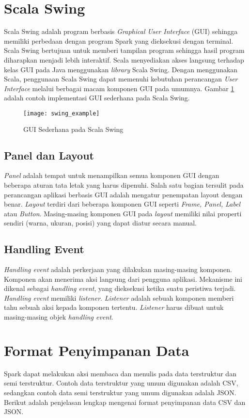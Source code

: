 \section{Scala Swing} 
Scala Swing adalah program berbasis \textit{Graphical User Interface} (GUI) sehingga memiliki perbedaan dengan program Spark yang dieksekusi dengan terminal. Scala Swing bertujuan untuk memberi tampilan program sehingga hasil program diharapkan menjadi lebih interaktif. Scala menyediakan akses langsung terhadap kelas GUI pada Java menggunakan \textit{library} Scala Swing.  Dengan menggunakan Scala, penggunaan Scala Swing dapat memenuhi kebutuhan perancangan \textit{User Interface} melalui berbagai macam komponen GUI pada umumnya. Gambar \ref{fig:swing_example} adalah contoh implementasi GUI sederhana pada Scala Swing.
\begin{figure}[H]
	\centering
	\texttt{[image: swing\_example]}
	\caption{GUI Sederhana pada Scala Swing}
	\label{fig:swing_example}
\end{figure}


\subsection{Panel dan Layout}
\textit{Panel} adalah tempat untuk menampilkan semua komponen GUI dengan beberapa aturan tata letak yang harus dipenuhi. Salah satu bagian tersulit pada perancangan aplikasi berbasis GUI adalah mengatur penempatan layout dengan benar. \textit{Layout} terdiri dari beberapa komponen GUI seperti \textit{Frame, Panel, Label} atau \textit{Button}. Masing-masing komponen GUI pada \textit{layout} memiliki nilai properti sendiri (warna, ukuran, posisi) yang dapat diatur secara manual.

\subsection{Handling Event}
\textit{Handling event} adalah perkerjaan yang dilakukan masing-masing komponen. Komponen akan menerima aksi langsung dari pengguna aplikasi. Mekanisme ini dikenal sebagai \textit{handling event}, yang dieksekusi ketika suatu peristiwa terjadi. \textit{Handling event} memiliki \textit{listener}. \textit{Listener} adalah sebuah komponen memberi tahu sebuah aksi kepada komponen tertentu. \textit{Listener} harus dibuat untuk masing-masing objek \textit{handling event}. 

\section{Format Penyimpanan Data}
\label{theory:csv}
Spark dapat melakukan aksi membaca dan menulis pada data terstruktur dan semi terstruktur. Contoh data terstruktur yang umum digunakan adalah CSV, sedangkan contoh data semi terstruktur yang umum digunakan adalah JSON. Berikut adalah penjelasan lengkap mengenai format penyimpanan data CSV dan JSON.

